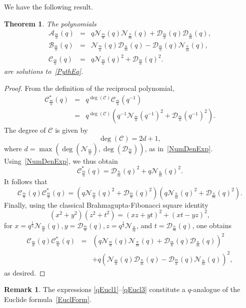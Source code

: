 \documentclass{article}[12pt]
\theoremstyle{plain}
\newtheorem{thm}{Theorem}
\theoremstyle{definition}
\newtheorem*{rem}{Remark}
\newcommand{\A}{\mathcal{A}}
\newcommand{\B}{\mathcal{B}}
\newcommand{\cC}{\mathcal{C}}
\newcommand{\cD}{\mathcal{D}}
\newcommand{\cN}{\mathcal{N}}
\newcommand{\half}{\frac{1}{2}}
\begin{document}
We have the following result.

\begin{thm}
\label{CalcThm}
The polynomials
\begin{eqnarray}
\label{qEucl1}
\A_{\frac{m}{n}}(q)&=&
q\cN_{\frac{m}{n}}(q)\cN_{\frac{n}{m}}(q)+\cD_{\frac{m}{n}}(q)\cD_{\frac{n}{m}}(q),
\\[4pt]
\label{qEucl2}
\B_{\frac{m}{n}}(q)&=&
\cN_{\frac{m}{n}}(q)\cD_{\frac{n}{m}}(q)-\cD_{\frac{m}{n}}(q)\cN_{\frac{n}{m}}(q),
\\[4pt]
\label{qEucl3}
\cC_{\frac{m}{n}}(q)&=&
q\cN_{\frac{m}{n}}(q)^2+\cD_{\frac{m}{n}}(q)^2.
\end{eqnarray}
are solutions to~\eqref{PythEq}.
\end{thm}

\begin{proof}
From the definition of the reciprocal polynomial,
\begin{eqnarray*}
\cC^*_{\frac{m}{n}}(q) &=&
q^{\deg(\cC)}\cC_{\frac{m}{n}}(q^{-1})\\
&=&
q^{\deg(\cC)}\left(q^{-1}\cN_{\frac{m}{n}}(q^{-1})^2+\cD_{\frac{m}{n}}(q^{-1})^2\right).
\end{eqnarray*}
The degree of $\cC$ is given by
$$
\deg(\cC)=2d+1,
$$
where $d=\max(\deg(\cN_{\frac{m}{n}}),\deg(\cD_{\frac{m}{n}}))$, as in~\eqref{NumDenExp}.
Using~\eqref{NumDenExp}, we thus obtain
$$
\cC^*_{\frac{m}{n}}(q)=
\cD_{\frac{n}{m}}(q)^2+q\cN_{\frac{n}{m}}(q)^2.
$$
It follows that
$$
\cC_{\frac{m}{n}}(q)\cC^*_{\frac{m}{n}}(q)=
\left(q\cN_{\frac{m}{n}}(q)^2+\cD_{\frac{m}{n}}(q)^2\right)
\left(q\cN_{\frac{n}{m}}(q)^2+\cD_{\frac{n}{m}}(q)^2\right).
$$
Finally, using the classical Brahmagupta-Fibonacci square identity
$$
(x^2+y^2)(z^2+t^2)=(xz+yt)^2+(xt-yz)^2,
$$ 
for $x=q^\half\cN_{\frac{m}{n}}(q), 
y=\cD_{\frac{m}{n}}(q),
z=q^\half\cN_{\frac{n}{m}}$, and $t=\cD_{\frac{n}{m}}(q)$,
one obtains
\begin{eqnarray*}
\cC_{\frac{m}{n}}(q)\cC^*_{\frac{m}{n}}(q) &=&
\left(q\cN_{\frac{m}{n}}(q)\cN_{\frac{n}{m}}(q)+\cD_{\frac{m}{n}}(q)\cD_{\frac{n}{m}}(q)\right)^2\\
&&+q\left(\cN_{\frac{m}{n}}(q)\cD_{\frac{n}{m}}(q)-\cD_{\frac{m}{n}}(q)\cN_{\frac{n}{m}}(q)\right)^2,
\end{eqnarray*}
as desired.
\end{proof}

\begin{rem}
The expressions \eqref{qEucl1}--\eqref{qEucl3} constitute a $q$-analogue of the Euclide
formula~\eqref{EuclForm}.
\end{rem}
\end{document}
